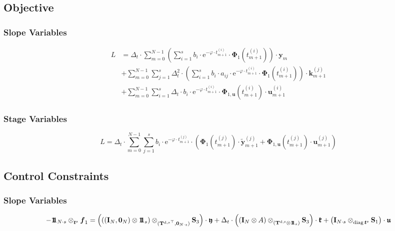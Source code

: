 \documentclass{article}
\newcommand{\tp}{\top}%
\newcommand{\kron}{\otimes}%
\newcommand{\dkron}[2][]{\mathbin{\kron_{#2}^{#1}}}%
\newcommand{\expe}{\mathrm{e}}%
\newcommand{\diag}{\mathop{\mathrm{diag}}}%
\newcommand{\vectorfont}[1]{\boldsymbol{#1}}%
\newcommand{\greekvectorfont}[1]{\boldsymbol{#1}}%
\newcommand{\matrixfont}[1]{\mathbf{#1}}%
\newcommand{\fvec}{\vectorfont{f}}
\newcommand{\kvec}{\vectorfont{k}}
\newcommand{\tvec}{\vectorfont{t}}
\newcommand{\uvec}{\vectorfont{u}}
\newcommand{\yvec}{\vectorfont{y}}
\newcommand{\tildeyvec}{\vectorfont{\tilde{y}}}
\newcommand{\Phivec}{\greekvectorfont{\Phi}}
\newcommand{\kfrakvec}{\vectorfont{\mathfrak{k}}}
\newcommand{\ufrakvec}{\vectorfont{\mathfrak{u}}}
\newcommand{\yfrakvec}{\vectorfont{\mathfrak{y}}}
\newcommand{\nullvec}{\greekvectorfont{0}}
\newcommand{\einsvec}{\vectorfont{1}\negthinspace\negthinspace\vectorfont{1}} %
\newcommand{\Imat}{\matrixfont{I}}%
\newcommand{\Smat}{\matrixfont{S}}
\newcommand{\Tmat}{\matrixfont{T}}
\begin{document}
\subsection*{Objective}
\subsubsection*{Slope Variables}
\begin{align*}
L &= \Delta_t \cdot \sum_{m=0}^{N-1} \left(\sum_{i=1}^s b_i \cdot \expe^{-\varphi \cdot t_{m+1}^{(i)}} \cdot \Phivec_1 (t_{m+1}^{(i)}) \right) \cdot \yvec_{m} \\
 &+ \sum_{m=0}^{N-1} \sum_{j=1}^s \Delta_t^2 \cdot \left(\sum_{i=1}^s b_i \cdot a_{ij} \cdot \expe^{-\varphi \cdot t_{m+1}^{(i)}} \cdot \Phivec_1 (t_{m+1}^{(i)}) \right) \cdot \kvec_{m+1}^{(j)} \\
 &+ \sum_{m=0}^{N-1} \sum_{i=1}^s \Delta_t \cdot b_i \cdot \expe^{-\varphi \cdot t_{m+1}^{(i)}} \cdot \Phivec_{1,\uvec}(t_{m+1}^{(i)}) \cdot \uvec_{m+1}^{(i)}
\end{align*}

\subsubsection*{Stage Variables}
\[
L = \Delta_t \cdot \sum_{m=0}^{N-1} \sum_{j=1}^s b_i \cdot \expe^{-\varphi \cdot t_{m+1}^{(j)}} \cdot \left(\Phivec_1(t_{m+1}^{(j)})\cdot \tildeyvec_{m+1}^{(j)} + \Phivec_{1,\uvec}(t_{m+1}^{(j)}) \cdot \uvec_{m+1}^{(j)}\right) 
\]


\subsection*{Control Constraints}
\subsubsection*{Slope Variables}
\[
-\einsvec_{N\cdot s} \dkron{\tvec^{\mathrm{s}}} \fvec_1
 = \left( \left( (\Imat_{N}, \nullvec_N) \kron \einsvec_s\right) \dkron{({\Tmat^{\mathrm{d},\mathrm{s}}}^{\tp},\nullvec_{N \cdot s})} \Smat_3 \right) \cdot \yfrakvec
 + \Delta_t \cdot \left(  (\Imat_{N} \kron A) \dkron{(\Tmat^{\mathrm{d},\mathrm{s}} \kron \einsvec_s)} \Smat_3 \right)\cdot \kfrakvec
 + \left(\Imat_{N \cdot s} \dkron{\diag \tvec^{\mathrm{s}}} \Smat_1  \right) \cdot \ufrakvec
\]
\end{document}
